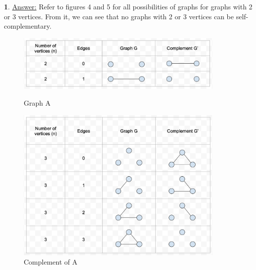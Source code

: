 \documentclass[12pt,a4paper]{article}
\theoremstyle{definition}
\newtheorem{problem}{}
\begin{document}
\begin{problem}
\underline{Answer:} Refer to figures 4 and 5 for all possibilities of graphs for graphs with 2 or 3 vertices. From it, we can see that no graphs with 2 or 3 vertices can be self-complementary.

\begin{figure}[H]
    \centering
    \begin{minipage}{0.5\textwidth}
        \centering
        \includegraphics[width=0.9\textwidth]{q5a.png} %
        \caption{Graph A}
    \end{minipage}\hfill
    \begin{minipage}{0.5\textwidth}
        \centering
        \includegraphics[width=0.9\textwidth]{q5b.png} %
        \caption{Complement of A}
    \end{minipage}
\end{figure}
\end{problem}
\end{document}
